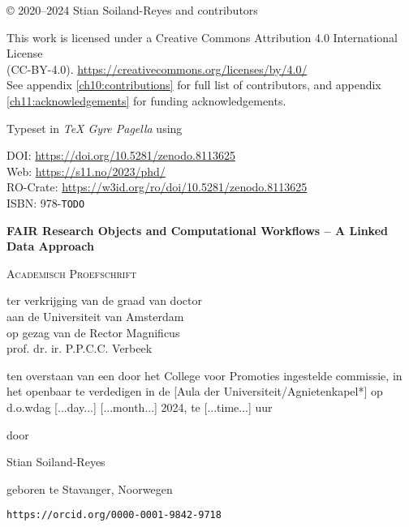 \newpage

\vspace*{\fill}

© 2020--2024 Stian Soiland-Reyes and contributors

This work is licensed under a Creative Commons Attribution 4.0 International License \\
(CC-BY-4.0). \url{https://creativecommons.org/licenses/by/4.0/}\\
See appendix \ref{ch10:contributions} for full list of contributors, and appendix \ref{ch11:acknowledgements} for funding acknowledgements.


Typeset in \emph{TeX Gyre Pagella} using \mybanner

DOI: \url{https://doi.org/10.5281/zenodo.8113625}\\
Web: \url{https://s11.no/2023/phd/} \\
RO-Crate: \url{https://w3id.org/ro/doi/10.5281/zenodo.8113625}\\
ISBN: 978-\texttt{TODO}

\newpage

\begin{center}

    
\Huge
\textbf{FAIR Research Objects and Computational Workflows – A Linked Data Approach}
     
\vspace*{\fill}

\LARGE
\textsc{Academisch Proefschrift}

\vspace*{\fill}

\large
{ \itshape

ter verkrijging van de graad van doctor\\
aan de Universiteit van Amsterdam\\
op gezag van de Rector Magnificus\\
prof. dr. ir. P.P.C.C. Verbeek

ten overstaan van een door het College voor Promoties ingestelde commissie,
in het openbaar te verdedigen in de [Aula der Universiteit/Agnietenkapel*]
op d.o.wdag [...day...] [...month...] 2024, te [...time...] uur

door 
}

\vspace*{\fill}

\LARGE
Stian Soiland-Reyes

\large
geboren te Stavanger, Noorwegen 

\texttt{https://orcid.org/0000-0001-9842-9718} 
\end{center}

